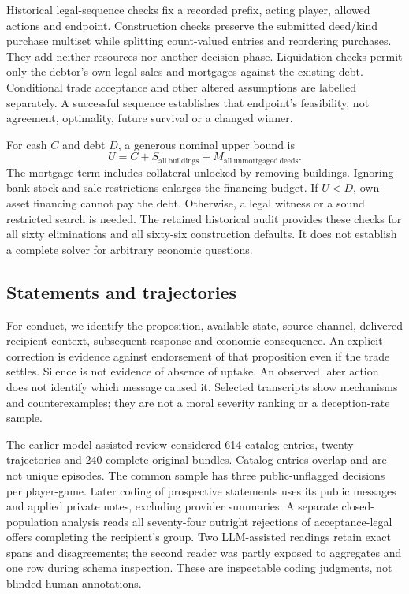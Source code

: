 Historical legal-sequence checks fix a recorded prefix, acting player, allowed actions and endpoint. Construction checks preserve the submitted deed/kind purchase multiset while splitting count-valued entries and reordering purchases. They add neither resources nor another decision phase. Liquidation checks permit only the debtor's own legal sales and mortgages against the existing debt. Conditional trade acceptance and other altered assumptions are labelled separately. A successful sequence establishes that endpoint's feasibility, not agreement, optimality, future survival or a changed winner.

For cash $C$ and debt $D$, a generous nominal upper bound is
\begin{equation}
U=C+S_{\mathrm{all\ buildings}}+M_{\mathrm{all\ unmortgaged\ deeds}}.
\label{eq:bound}
\end{equation}
The mortgage term includes collateral unlocked by removing buildings. Ignoring bank stock and sale restrictions enlarges the financing budget. If $U<D$, own-asset financing cannot pay the debt. Otherwise, a legal witness or a sound restricted search is needed. The retained historical audit provides these checks for all sixty eliminations and all sixty-six construction defaults. It does not establish a complete solver for arbitrary economic questions.

\subsection{Statements and trajectories}

For conduct, we identify the proposition, available state, source channel, delivered recipient context, subsequent response and economic consequence. An explicit correction is evidence against endorsement of that proposition even if the trade settles. Silence is not evidence of absence of uptake. An observed later action does not identify which message caused it. Selected transcripts show mechanisms and counterexamples; they are not a moral severity ranking or a deception-rate sample.

The earlier model-assisted review considered 614 catalog entries, twenty trajectories and 240 complete original bundles. Catalog entries overlap and are not unique episodes. The common sample has three public-unflagged decisions per player-game. Later coding of prospective statements uses its public messages and applied private notes, excluding provider summaries. A separate closed-population analysis reads all seventy-four outright rejections of acceptance-legal offers completing the recipient's group. Two LLM-assisted readings retain exact spans and disagreements; the second reader was partly exposed to aggregates and one row during schema inspection. These are inspectable coding judgments, not blinded human annotations.

